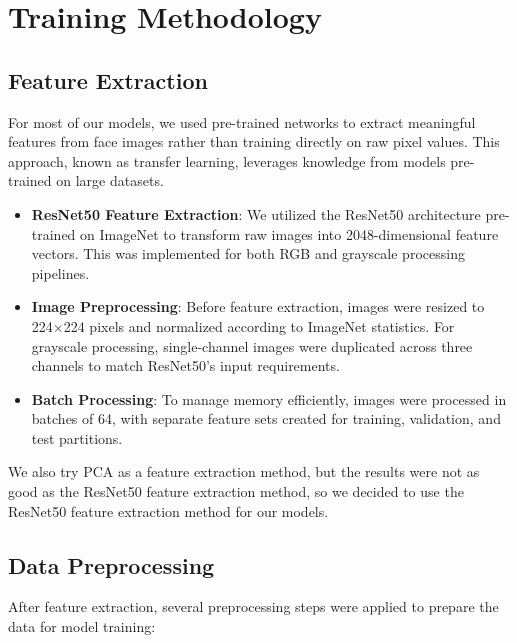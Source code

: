 \documentclass{article}
\begin{document}
\newpage
\section{Training Methodology}

\subsection{Feature Extraction}

For most of our models, we used pre-trained networks to extract meaningful features from face images rather than training directly on raw pixel values. This approach, known as transfer learning, leverages knowledge from models pre-trained on large datasets.

\begin{itemize}
    \item \textbf{ResNet50 Feature Extraction}: We utilized the ResNet50 architecture pre-trained on ImageNet to transform raw images into 2048-dimensional feature vectors. This was implemented for both RGB and grayscale processing pipelines.
    
    \item \textbf{Image Preprocessing}: Before feature extraction, images were resized to 224×224 pixels and normalized according to ImageNet statistics. For grayscale processing, single-channel images were duplicated across three channels to match ResNet50's input requirements.
    
    \item \textbf{Batch Processing}: To manage memory efficiently, images were processed in batches of 64, with separate feature sets created for training, validation, and test partitions.
\end{itemize}

We also try PCA as a feature extraction method, but the results were not as good as the ResNet50 feature extraction method, so we decided to use the ResNet50 feature extraction method for our models.

\subsection{Data Preprocessing}

After feature extraction, several preprocessing steps were applied to prepare the data for model training:
\end{document}
